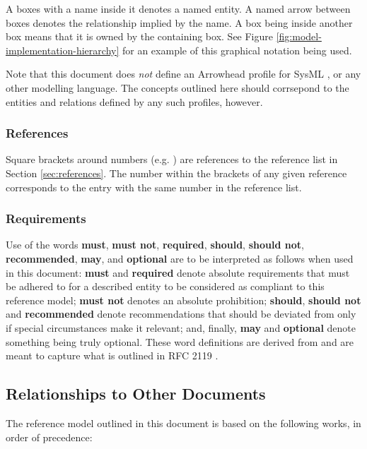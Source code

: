 A boxes with a name inside it denotes a named entity.
A named arrow between boxes denotes the relationship implied by the name.
A box being inside another box means that it is owned by the containing box.
See Figure \ref{fig:model-implementation-hierarchy} for an example of this graphical notation being used.

Note that this document does \textit{not} define an Arrowhead profile for SysML \cite{omg2019sysml}, or any other modelling language.
The concepts outlined here should corrsepond to the entities and relations defined by any such profiles, however.

\subsubsection{References}

Square brackets around numbers (e.g. \cite{delsing2017iot}) are references to the reference list in Section \ref{sec:references}.
The number within the brackets of any given reference corresponds to the entry with the same number in the reference list.

\subsubsection{Requirements}

Use of the words \textbf{must}, \textbf{must not}, \textbf{required}, \textbf{should}, \textbf{should not}, \textbf{recommended}, \textbf{may}, and \textbf{optional} are to be interpreted as follows when used in this document: \textbf{must} and \textbf{required} denote absolute requirements that must be adhered to for a described entity to be considered as compliant to this reference model; \textbf{must not} denotes an absolute prohibition; \textbf{should}, \textbf{should not} and \textbf{recommended} denote recommendations that should be deviated from only if special circumstances make it relevant; and, finally, \textbf{may} and \textbf{optional} denote something being truly optional.
These word definitions are derived from and are meant to capture what is outlined in RFC 2119 \cite{bradner1997keywords}.

\subsection{Relationships to Other Documents}
\label{sec:introduction:relationships}

The reference model outlined in this document is based on the following works, in order of precedence:

